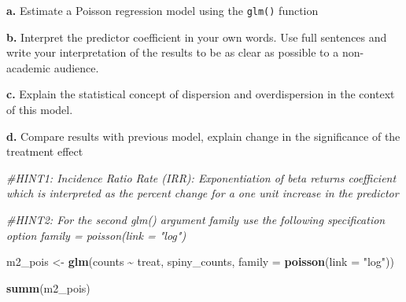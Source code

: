 \documentclass[
]{article}
\newenvironment{Shaded}{\begin{snugshade}}{\end{snugshade}}
\newcommand{\AttributeTok}[1]{\textcolor[rgb]{0.13,0.29,0.53}{#1}}
\newcommand{\CommentTok}[1]{\textcolor[rgb]{0.56,0.35,0.01}{\textit{#1}}}
\newcommand{\FunctionTok}[1]{\textcolor[rgb]{0.13,0.29,0.53}{\textbf{#1}}}
\newcommand{\NormalTok}[1]{#1}
\newcommand{\OtherTok}[1]{\textcolor[rgb]{0.56,0.35,0.01}{#1}}
\newcommand{\SpecialCharTok}[1]{\textcolor[rgb]{0.81,0.36,0.00}{\textbf{#1}}}
\newcommand{\StringTok}[1]{\textcolor[rgb]{0.31,0.60,0.02}{#1}}
\begin{document}
\textbf{a.} Estimate a Poisson regression model using the \texttt{glm()}
function

\textbf{b.} Interpret the predictor coefficient in your own words. Use
full sentences and write your interpretation of the results to be as
clear as possible to a non-academic audience.

\textbf{c.} Explain the statistical concept of dispersion and
overdispersion in the context of this model.

\textbf{d.} Compare results with previous model, explain change in the
significance of the treatment effect

\begin{Shaded}
\begin{Highlighting}[]
\CommentTok{\#HINT1: Incidence Ratio Rate (IRR): Exponentiation of beta returns coefficient which is interpreted as the \textquotesingle{}percent change\textquotesingle{} for a one unit increase in the predictor }

\CommentTok{\#HINT2: For the second glm() argument \textasciigrave{}family\textasciigrave{} use the following specification option \textasciigrave{}family = poisson(link = "log")\textasciigrave{}}

\NormalTok{m2\_pois }\OtherTok{\textless{}{-}} \FunctionTok{glm}\NormalTok{(counts }\SpecialCharTok{\textasciitilde{}}\NormalTok{ treat,}
\NormalTok{               spiny\_counts,}
               \AttributeTok{family =} \FunctionTok{poisson}\NormalTok{(}\AttributeTok{link =} \StringTok{"log"}\NormalTok{))}

\FunctionTok{summ}\NormalTok{(m2\_pois)}
\end{Highlighting}
\end{Shaded}
\end{document}

